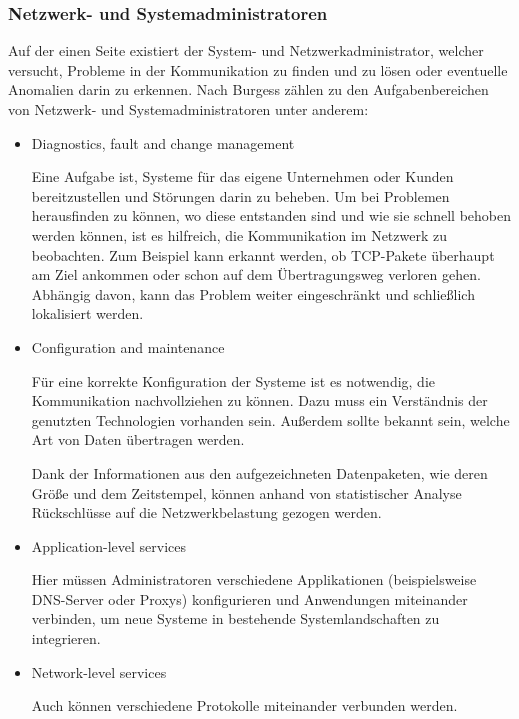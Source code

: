     \subsubsection{Netzwerk- und Systemadministratoren} \label{NetzwerkUndSystemadmin}
    Auf der einen Seite existiert der System- und Netzwerkadministrator, welcher versucht, Probleme in der Kommunikation zu finden und zu lösen oder eventuelle Anomalien darin zu erkennen.
    Nach Burgess \cite{burgess2004principles} zählen zu den Aufgabenbereichen von Netzwerk- und Systemadministratoren unter anderem:
    \begin{itemize}
        \item \glqq Diagnostics, fault and change management\grqq{}
        
        Eine Aufgabe ist, Systeme für das eigene Unternehmen oder Kunden bereitzustellen und Störungen darin zu beheben. Um bei Problemen herausfinden zu können, wo diese entstanden sind und wie sie schnell behoben werden können, ist es hilfreich, die Kommunikation im Netzwerk zu beobachten. Zum Beispiel kann erkannt werden, ob \ac{TCP}-Pakete überhaupt am Ziel ankommen oder schon auf dem Übertragungsweg verloren gehen. Abhängig davon, kann das Problem weiter eingeschränkt und schließlich lokalisiert werden.
        
        \item \glqq Configuration and maintenance\grqq{}
        
        Für eine korrekte Konfiguration der Systeme ist es notwendig, die Kommunikation nachvollziehen zu können. Dazu muss ein Verständnis der genutzten Technologien vorhanden sein. Außerdem sollte bekannt sein, welche Art von Daten übertragen werden.
        
        Dank der Informationen aus den aufgezeichneten Datenpaketen, wie deren Größe und dem Zeitstempel, können anhand von statistischer Analyse Rückschlüsse auf die Netzwerkbelastung gezogen werden.
        
        \item \glqq Application-level services\grqq{}
        
        Hier müssen Administratoren verschiedene Applikationen (beispielsweise \ac{DNS}-Server oder Proxys) konfigurieren und Anwendungen miteinander verbinden, um neue Systeme in bestehende Systemlandschaften zu integrieren.
        
        \item \glqq Network-level services\grqq{}
        
        Auch können verschiedene Protokolle miteinander verbunden werden.
        
    \end{itemize}

